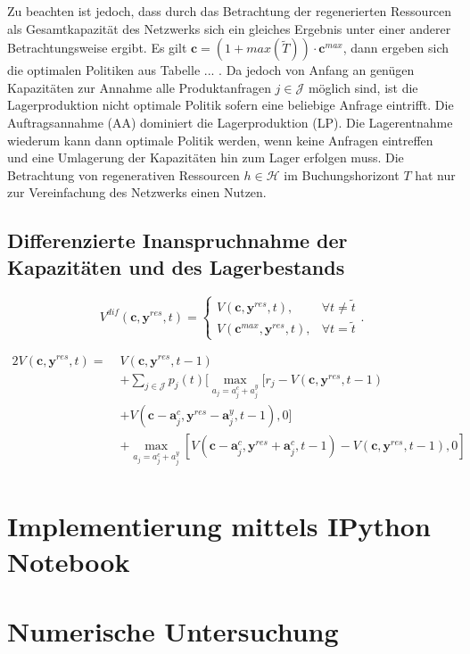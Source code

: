 Zu beachten ist jedoch, dass durch das Betrachtung der regenerierten Ressourcen als Gesamtkapazität des Netzwerks sich ein gleiches Ergebnis unter einer anderer Betrachtungsweise ergibt. Es gilt $\textbf{c}=(1+max(\tilde{T}))\cdot \textbf{c}^{max}$, dann ergeben sich die optimalen Politiken aus Tabelle ... . Da jedoch von Anfang an genügen Kapazitäten zur Annahme alle Produktanfragen $j\in\mathcal{J}$ möglich sind, ist die Lagerproduktion nicht optimale Politik sofern eine beliebige Anfrage eintrifft. Die Auftragsannahme (AA) dominiert die Lagerproduktion (LP). Die Lagerentnahme wiederum kann dann optimale Politik werden, wenn keine Anfragen eintreffen und eine Umlagerung der Kapazitäten hin zum Lager erfolgen muss. Die Betrachtung von regenerativen Ressourcen $h\in\mathcal{H}$ im Buchungshorizont $T$ hat nur zur Vereinfachung des Netzwerks einen Nutzen.



\subsection{Differenzierte Inanspruchnahme der Kapazitäten und des Lagerbestands}

\begin{equation}\label{dif}
     V^{dif}(\textbf{c}, \textbf{y}^{res}, t)=\left\{\begin{array}{ll} V(\textbf{c}, \textbf{y}^{res}, t), & \forall t\neq\tilde{t}\\
         V(\textbf{c}^{max}, \textbf{y}^{res}, t), &\forall t=\tilde{t}\end{array}\right. .
\end{equation}

\begin{alignat*}{2}
 V(\textbf{c}, \textbf{y}^{res}, t) = \;& V(\textbf{c}, \textbf{y}^{res}, t-1)\\
&+ \sum_{j \in \mathcal{J}}p_{j}(t)[\max_{a_{j}=a_{j}^c+a_{j}^y}[r_{j} - V(\textbf{c}, \textbf{y}^{res}, t-1)\\
&+ V(\textbf{c}-\textbf{a}_j^c, \textbf{y}^{res}-\textbf{a}_{j}^y, t-1),0] \\
&+ \max_{a_{j}=a_{j}^c+a_{j}^y}[V(\textbf{c}-\textbf{a}_{j}^c, \textbf{y}^{res}+\textbf{a}_j^c, t-1) - V(\textbf{c}, \textbf{y}^{res}, t-1),0]\\
\end{alignat*}

\section{Implementierung mittels IPython Notebook}

\section{Numerische Untersuchung}